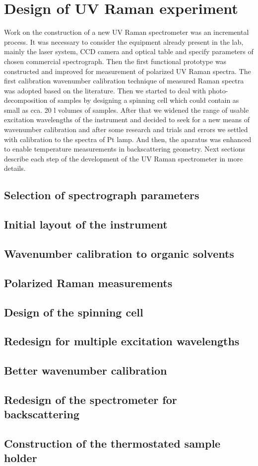 \section{Design of UV Raman experiment}

Work on the construction of a new UV Raman spectrometer was an incremental
process. It was necessary to consider the equipment already present in the lab,
mainly the laser system, CCD camera and optical table and specify parameters of
chosen commercial spectrograph. Then the first functional prototype was
constructed and improved for measurement of polarized UV Raman spectra. The
first calibration wavenumber calibration technique of measured Raman spectra
was adopted based on the literature. Then we started to deal with
photo-decomposition of samples by designing a spinning cell which could contain
as small as cca. 20 l volumes of samples. After that we widened the range
of usable excitation wavelengths of the instrument and decided to seek for a
new means of wavenumber calibration and after some research and trials and
errors we settled with calibration to the spectra of Pt lamp. And then, the
aparatus was enhanced to enable temperature measurements in backscattering
geometry. Next sections describe each step of the development of the UV Raman
spectrometer in more details.

\subsection{Selection of spectrograph parameters}
\subsection{Initial layout of the instrument}



\subsection{Wavenumber calibration to organic solvents}
\subsection{Polarized Raman measurements}
\subsection{Design of the spinning cell}
\subsection{Redesign for multiple excitation wavelengths}
\subsection{Better wavenumber calibration}
\subsection{Redesign of the spectrometer for backscattering}
\subsection{Construction of the thermostated sample holder}
